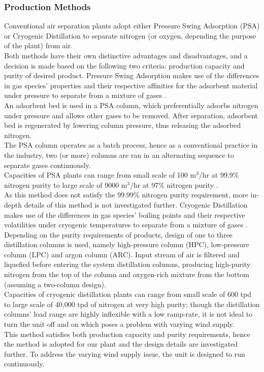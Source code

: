 	\subsubsection{Production Methods} \noindent
    Conventional air separation plants adopt either Pressure Swing Adsorption (PSA) or Cryogenic Distillation to separate nitrogen (or oxygen, depending the purpose of the plant) from air. \\
    Both methods have their own distinctive advantages and disadvantages, and a decision  is made based on the following two criteria: production capacity and purity of desired product.  
        Pressure Swing Adsorption makes use of the differences in gas species' properties and their respective affinities for the adsorbent material under pressure to separate from a mixture of gases \citep{linde_PSA}. \\
        An adsorbent bed is used in a PSA column, which preferentially adsorbs nitrogen under pressure and allows other gases to be removed. After separation, adsorbent bed is regenerated by lowering column pressure, thus releasing the adsorbed nitrogen.\\
        The PSA column operates as a batch process, hence as a conventional practice in the industry, two  (or more) columns are ran in an alternating sequence to separate gases continuously.\\
        Capacities of PSA plants can range from small scale of 100 m$^3$/hr at 99.9\% nitrogen purity to large scale of 9000 m$^3$/hr at 97\% nitrogen purity \citep{PRISM}. \\
        As this method does not satisfy the 99.99\% nitrogen purity requirement, more in-depth details of this method is not investigated further.
        Cryogenic Distillation makes use of the differences in gas species' boiling points and their respective volatilities under cryogenic temperatures to separate from a mixture of gases \citep{linde_cryo}.\\
        Depending on the purity requirements of products, design of one to three distillation columns is used, namely high-pressure column (HPC), low-pressure column (LPC) and argon column (ARC). Input stream of air is filtered and liquefied before entering the system distillation columns, producing high-purity nitrogen from the top of the column and oxygen-rich mixture from the bottom (assuming a two-column design).\\
        Capacities of cryogenic distillation plants can range from small scale of 600 tpd to large scale of 40,000 tpd of nitrogen at very high purity; though the distillation columns' load range are highly inflexible with a low ramp-rate, it is not ideal to turn the unit off and on which poses a problem with varying wind supply. \\
        This method satisfies both production capacity and purity requirements, hence the method is adopted for our plant and the design details are investigated further. To address the varying wind supply issue, the unit is designed to run continuously.
